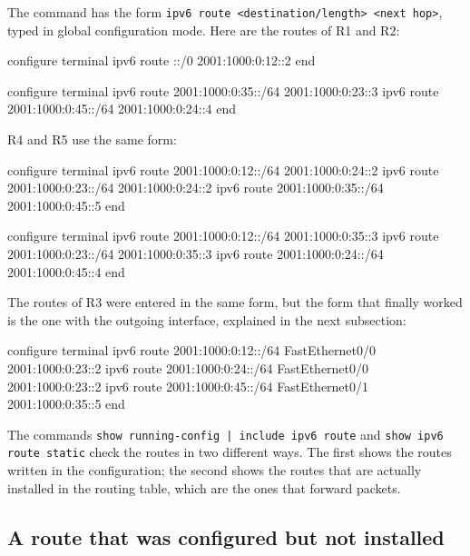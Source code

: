 The command has the form \texttt{ipv6 route <destination/length> <next hop>}, typed in global configuration mode. Here are the routes of R1 and R2:

\begin{codeblock}
configure terminal
ipv6 route ::/0 2001:1000:0:12::2
end
\end{codeblock}

\begin{codeblock}
configure terminal
ipv6 route 2001:1000:0:35::/64 2001:1000:0:23::3
ipv6 route 2001:1000:0:45::/64 2001:1000:0:24::4
end
\end{codeblock}

R4 and R5 use the same form:

\begin{codeblock}
configure terminal
ipv6 route 2001:1000:0:12::/64 2001:1000:0:24::2
ipv6 route 2001:1000:0:23::/64 2001:1000:0:24::2
ipv6 route 2001:1000:0:35::/64 2001:1000:0:45::5
end
\end{codeblock}

\begin{codeblock}
configure terminal
ipv6 route 2001:1000:0:12::/64 2001:1000:0:35::3
ipv6 route 2001:1000:0:23::/64 2001:1000:0:35::3
ipv6 route 2001:1000:0:24::/64 2001:1000:0:45::4
end
\end{codeblock}

The routes of R3 were entered in the same form, but the form that finally worked is the one with the outgoing interface, explained in the next subsection:

\begin{codeblock}
configure terminal
ipv6 route 2001:1000:0:12::/64 FastEthernet0/0 2001:1000:0:23::2
ipv6 route 2001:1000:0:24::/64 FastEthernet0/0 2001:1000:0:23::2
ipv6 route 2001:1000:0:45::/64 FastEthernet0/1 2001:1000:0:35::5
end
\end{codeblock}

The commands \texttt{show running-config | include ipv6 route} and \texttt{show ipv6 route static} check the routes in two different ways. The first shows the routes written in the configuration; the second shows the routes that are actually installed in the routing table, which are the ones that forward packets.

\subsection{A route that was configured but not installed}
\label{sec:lab01-static-issue}

